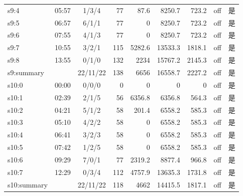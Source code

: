 \begin{tabular}{@{}llcrrrrrc@{}}
s9:4 & 05:57 & 1/3/4 & 77 & 87.6 & 8250.7 & 723.2 & off & 是\\
s9:5 & 06:57 & 6/1/1 & 77 & 0 & 8250.7 & 723.2 & off & 是\\
s9:6 & 07:55 & 4/1/3 & 77 & 0 & 8250.7 & 723.2 & off & 是\\
s9:7 & 10:55 & 3/2/1 & 115 & 5282.6 & 13533.3 & 1818.1 & off & 是\\
s9:8 & 13:55 & 0/1/0 & 132 & 2234 & 15767.2 & 2145.3 & off & 是\\
s9:summary &  & 22/11/22 & 138 & 6656 & 16558.7 & 2227.2 & off & 是\\
s10:0 & 00:00 & 0/0/0 & 0 & 0 & 0 & 0 & off & 是\\
s10:1 & 02:39 & 2/1/5 & 56 & 6356.8 & 6356.8 & 564.3 & off & 是\\
s10:2 & 04:21 & 5/1/2 & 58 & 201.4 & 6558.2 & 585.3 & off & 是\\
s10:3 & 05:10 & 4/2/2 & 58 & 0 & 6558.2 & 585.3 & off & 是\\
s10:4 & 06:41 & 3/2/3 & 58 & 0 & 6558.2 & 585.3 & off & 是\\
s10:5 & 07:42 & 1/2/5 & 58 & 0 & 6558.2 & 585.3 & off & 是\\
s10:6 & 09:29 & 7/0/1 & 77 & 2319.2 & 8877.4 & 966.8 & off & 是\\
s10:7 & 12:29 & 0/3/4 & 112 & 4757.9 & 13635.3 & 1731.8 & off & 是\\
s10:summary &  & 22/11/22 & 118 & 4662 & 14415.5 & 1817.1 & off & 是\\
\bottomrule
\end{tabular}
